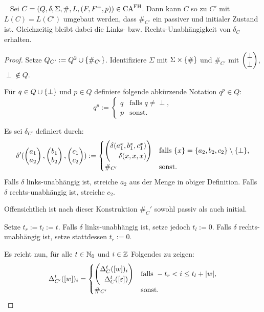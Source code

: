 \begin{satz}~\newline
    Sei $C = (Q, \delta, \Sigma, \#, L, (F, F^+, p)) \in \textrm{CA}^{\textrm{FH}}$.
    Dann kann $C$ so zu $C'$ mit $L(C) = L(C')$ umgebaut werden, dass $\#_{C'}$ ein passiver und initialer Zustand ist.
    Gleichzeitig bleibt dabei die Links- \acs{bzw.} Rechts-Unabhängigkeit von $\delta_C$ erhalten.
\end{satz}
\begin{proof}
    Setze $Q_{C'} := Q^2 \cup \{ { \#_{C'} } \}$. Identifiziere $\Sigma$ mit $ \Sigma \times \{ {\#} \}$ und $\#_{C'}$ mit $\Spvek{\perp; \perp}$, $\perp \not\in Q$.

    Für $q \in Q \cup \{ {\perp} \}$ und $p \in Q$ definiere folgende abkürzende Notation $q^p \in Q$:
    \[
        q^p := 
        \begin{cases}
            q & \text{falls } q \neq \perp, \\
            p & \text{sonst.}
        \end{cases}
    \]
    
    Es sei $\delta_{C'}$ definiert durch:
    \[
       \delta'(\Spvek{a_1; a_2}, \Spvek{b_1; b_2}, \Spvek{c_1; c_2}) :=
       \begin{cases}
         \Spvek{  \delta(a_1 ^ {x}, b_1 ^ {x}, c_1 ^ {x}); \delta(x, x, x)  } 
         & \text{falls }
         \finset{x} = \finset{a_2, b_2, c_2} \setminus \finset{ \perp }, \\
         \#_{C'}
         & \text{sonst.}
       \end{cases}
    \]
    Falls $\delta$ links-unabhängig ist, streiche $a_2$ aus der Menge in obiger Definition.
    Falls $\delta$ rechts-unabhängig ist, streiche $c_2$.
    
    Offensichtlich ist nach dieser Konstruktion $\#_C'$ sowohl passiv als auch initial.
    
    Setze $t_r := t_l := t$.
    Falls $\delta$ links-unabhängig ist, setze jedoch $t_l := 0$.
    Falls $\delta$ rechts-unabhängig ist, setze stattdessen $t_r := 0$.
    
    Es reicht nun, für alle $t \in \mathbb{N}_0$ und $i \in \mathbb{Z}$ Folgendes zu zeigen:
    \[
        \Delta_{C'}^t([w])_i = \begin{cases}
            \Spvek{\Delta_C^t([w])_i; \Delta^t_{C}([\varepsilon])} &
                \text{falls } -t_r < i \leq t_l + |w|, \\
            \#_{C'} & \text{sonst.}
        \end{cases}
    \]
    

\end{proof}
